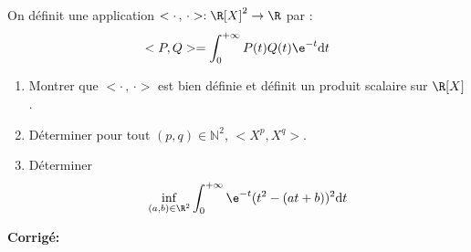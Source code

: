 \documentclass[a4paper,twoside,french,11pt]{VcCours}
\newcommand{\dt}{\text{d}t}
\newcommand{\corr}{\textbf{Corrigé:}}
\begin{document}
\begin{Exercice}{} On définit une application $< \cdot \, , \, \cdot> : \R[X]^2 \rightarrow \R$ par :
  \[
 <P,Q> = \int_{0}^{ + \infty} P(t)Q(t)\e^{ - t} \dt
  \]
  \begin{enumerate}
  \item Montrer que $< \cdot \, , \, \cdot>$ est bien définie et définit un produit scalaire sur $\R[X]$.
  \item Déterminer pour tout $(p,q) \in \mathbb{N}^2$, $<X^{p} ,X^{q}>$.
  \item Déterminer
    \[
    \inf_{(a,b) \in \R^{2}} \int_{0}^{ + \infty} \e^{ - t}(t^{2} - (at + b))^{2} \dt
    \]
  \end{enumerate}
\end{Exercice}

\corr 
\end{document}

